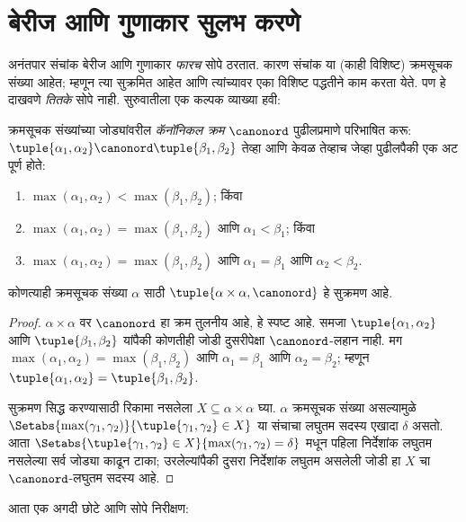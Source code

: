 \section{बेरीज आणि गुणाकार सुलभ करणे}\label{sth:card-arithmetic:simp:sec}

अनंतपार संचांक बेरीज आणि गुणाकार \emph{फारच} सोपे ठरतात. कारण संचांक या (काही विशिष्ट) क्रमसूचक संख्या आहेत; म्हणून त्या सुक्रमित आहेत आणि त्यांच्यावर एका विशिष्ट पद्धतीने काम करता येते. पण हे दाखवणे \emph{तितके} सोपे नाही. सुरुवातीला एक कल्पक व्याख्या हवी:

\begin{defn}
क्रमसूचक संख्यांच्या जोड्यांवरील \emph{कॅनॉनिकल क्रम} $\canonord$ पुढीलप्रमाणे परिभाषित करू: $\tuple{\alpha_1, \alpha_2} \canonord
\tuple{\beta_1, \beta_2}$ तेव्हा आणि केवळ तेव्हाच जेव्हा पुढीलपैकी एक अट पूर्ण होते:
\begin{enumerate}
  \item $\max(\alpha_1, \alpha_2) < \max(\beta_1, \beta_2)$; किंवा
  \item $\max(\alpha_1, \alpha_2) = \max(\beta_1, \beta_2)$ आणि
  $\alpha_1 < \beta_1$; किंवा
  \item $\max(\alpha_1, \alpha_2) = \max(\beta_1, \beta_2)$ आणि
  $\alpha_1 = \beta_1$ आणि $\alpha_2 < \beta_2$.
\end{enumerate}
\end{defn}

\begin{lem}
कोणत्याही क्रमसूचक संख्या $\alpha$ साठी $\tuple{\alpha \times \alpha, \canonord}$ हे सुक्रमण आहे.
\end{lem}

\begin{proof}
$\alpha \times \alpha$ वर $\canonord$ हा क्रम तुलनीय आहे, हे स्पष्ट आहे. समजा $\tuple{\alpha_1, \alpha_2}$ आणि $\tuple{\beta_1,
\beta_2}$ यांपैकी कोणतीही जोडी दुसरीपेक्षा $\canonord$-लहान नाही. मग $\max(\alpha_1,
\alpha_2) = \max(\beta_1, \beta_2)$ आणि $\alpha_1 = \beta_1$ आणि
$\alpha_2 = \beta_2$; म्हणून $\tuple{\alpha_1, \alpha_2} =
\tuple{\beta_1,  \beta_2}$.

सुक्रमण सिद्ध करण्यासाठी रिकामा नसलेला $X \subseteq \alpha\times\alpha$ घ्या. $\alpha$ क्रमसूचक संख्या असल्यामुळे
$\Setabs{\max(\gamma_1, \gamma_2)}{\tuple{\gamma_1,
\gamma_2} \in X}$ या संचाचा लघुतम सदस्य एखादा $\delta$ असतो. आता
$\Setabs{\tuple{\gamma_1,\gamma_2} \in X}{\max(\gamma_1, \gamma_2) =
\delta}$ मधून पहिला निर्देशांक लघुतम नसलेल्या सर्व जोड्या काढून टाका; उरलेल्यांपैकी दुसरा निर्देशांक लघुतम असलेली जोडी हा $X$ चा $\canonord$-लघुतम सदस्य आहे.
\end{proof}
\noindent
आता एक अगदी छोटे आणि सोपे निरीक्षण:

